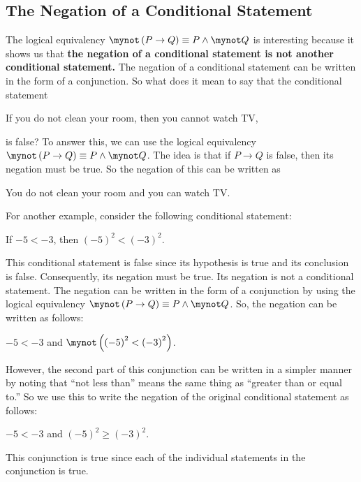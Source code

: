 \subsection*{The Negation of a Conditional Statement}
%
The logical equivalency $\mynot  \left( {P \to Q} \right) \equiv P \wedge \mynot  Q$ is interesting because it shows us that \textbf{the negation of a conditional statement is not another conditional statement.}
%
  The negation of a conditional statement can be written in the form of a conjunction.
So what does it mean to say that the conditional statement 
\begin{center}
If you do not clean your room, then you cannot watch TV,
\end{center}
is false?  To answer this, we can use the logical equivalency $\mynot  \left( {P \to Q} \right) \equiv P \wedge \mynot  Q$.  The idea is that if $P \to Q$ is false, then its negation must be true.  So the negation of this 
%
can be written as
\begin{center}
You do not clean your room and you can watch TV.
\end{center}
%
For another example, consider the following conditional statement:
%
\begin{center}
If $-5 < -3$, then $\left( -5 \right)^2 < \left( -3 \right)^2$.
\end{center}
%
This conditional statement is false since its hypothesis is true and its conclusion is false.  Consequently, its negation must be true.  Its negation is not a conditional statement.  The negation can be written in the form of a conjunction by using the logical equivalency 
$\mynot  \left( {P \to Q} \right) \equiv P \wedge \mynot  Q$.  So, the negation can be written as follows:
%
\begin{center}
$-5 < -3$  and  $\mynot \left( {\left( -5 \right)^2 < \left( -3 \right)^2} \right)$.
\end{center}
%
However, the second part of this conjunction can be written in a simpler manner by noting that ``not less than'' means the same thing as ``greater than or equal to.''  So we use this to write the negation of the original conditional statement as follows:
%
\begin{center}
$-5 < -3$  and  $\left( -5 \right)^2 \geqslant \left( -3 \right)^2$.
\end{center}
This conjunction is true since each of the individual statements in the conjunction is true.
\hbreak

\endinput
